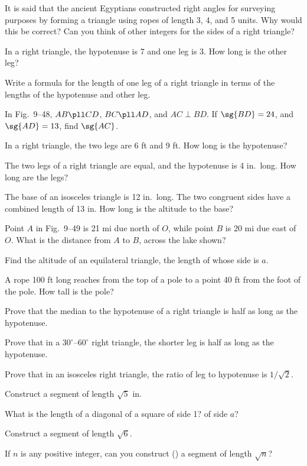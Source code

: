 \documentclass[11pt]{book}
\theoremstyle{bkplain}
\theoremstyle{XIplainnote}
\theoremstyle{bkplain}
\theoremstyle{bkplain}
\begin{document}
\begin{exercisecols}
\begin{exlist}
\item It is said that the ancient Egyptians constructed right angles for
      surveying purposes by forming a triangle using ropes of length 3, 4, and 5
      units. Why would this be correct? Can you think of other integers for the
      sides of a right triangle?
\item In a right triangle, the hypotenuse is 7 and one leg is 3. How long is the
      other leg?
\item Write a formula for the length of one leg of a right triangle in terms of
      the lengths of the hypotenuse and other leg.
\item[\stex 4.] In Fig.~9--48, $AB \pll CD$, $BC \pll AD$, and $AC \perp BD$. If
      $\sg{BD} = 24$, and $\sg{AD} = 13$, find $\sg{AC}$.
\exfig{\FIGIXFORTYEIGHT}
\item[5.] In a right triangle, the two legs are 6 ft and 9 ft. How long is the
      hypotenuse?
\item The two legs of a right triangle are equal, and the hypotenuse is 4 in.\
      long. How long are the legs?
\item The base of an isosceles triangle is 12 in.\ long. The two congruent sides
      have a combined length of 13 in. How long is the altitude to the base?
\item Point $A$ in Fig.~9--49 is 21 mi due north of $O$, while point $B$ is 20 mi
      due east of $O$. What is the distance from $A$ to $B$, across the lake
      shown?
\exfig{\FIGIXFORTYNINE}
\item Find the altitude of an equilateral triangle, the length of whose side is
      $a$.
\item A rope 100 ft long reaches from the top of a pole to a point 40 ft from the
      foot of the pole. How tall is the pole?
\item Prove that the median to the hypotenuse of a right triangle is half as long
      as the hypotenuse.
\item Prove that in a $30^\circ$--$60^\circ$ right triangle, the shorter leg is
      half as long as the hypotenuse.
\item Prove that in an isosceles right triangle, the ratio of leg to hypotenuse
      is $1/\sqrt{2}$.
\item Construct a segment of length $\sqrt{5}$ in.
\item What is the length of a diagonal of a square of side 1? of side $a$?
\item Construct a segment of length $\sqrt{6}$.
\item[\stex 17.] If $n$ is any positive integer, can you construct (\RC) a
      segment of length $\sqrt{n}$?
\end{exlist}
\end{exercisecols}
\end{document}
